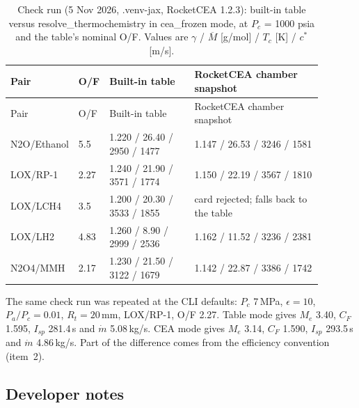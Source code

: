 {\small
\begin{longtable}{@{}P{0.13\linewidth}P{0.05\linewidth}P{0.29\linewidth}P{0.42\linewidth}@{}}
\caption{Check run (5 Nov 2026, .venv-jax, RocketCEA 1.2.3): built-in table versus resolve\_thermochemistry in cea\_frozen mode, at $P_c$ = 1000 psia and the table's nominal O/F. Values are $\gamma$ / $\overline{M}$ [g/mol] / $T_c$ [K] / $c^*$ [m/s].}\label{tab:s03-check}\\
\toprule
Pair & O/F & Built-in table & RocketCEA chamber snapshot \\
\midrule
\endfirsthead
\toprule
Pair & O/F & Built-in table & RocketCEA chamber snapshot \\
\midrule
\endhead
N2O/Ethanol & 5.5 & 1.220 / 26.40 / 2950 / 1477 & 1.147 / 26.53 / 3246 / 1581 \\
LOX/RP-1 & 2.27 & 1.240 / 21.90 / 3571 / 1774 & 1.150 / 22.19 / 3567 / 1810 \\
LOX/LCH4 & 3.5 & 1.200 / 20.30 / 3533 / 1855 & card  rejected; falls back to the table \\
LOX/LH2 & 4.83 & 1.260 / 8.90 / 2999 / 2536 & 1.162 / 11.52 / 3236 / 2381 \\
N2O4/MMH & 2.17 & 1.230 / 21.50 / 3122 / 1679 & 1.142 / 22.87 / 3386 / 1742 \\
\bottomrule
\end{longtable}
}
The same check run was repeated at the CLI defaults: $P_c$ 7\,MPa, $\epsilon=10$, $P_a/P_c=0.01$, $R_t=20$\,mm, LOX/RP-1, O/F 2.27. Table mode gives $M_e$ 3.40, $C_F$ 1.595, $I_{sp}$ 281.4\,s and $\dot m$ 5.08\,kg/s. CEA mode gives $M_e$ 3.14, $C_F$ 1.590, $I_{sp}$ 293.5\,s and $\dot m$ 4.86\,kg/s. Part of the difference comes from the efficiency convention (item~2).

\subsection{Developer notes}

